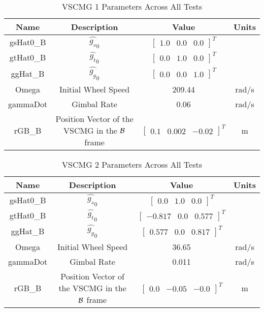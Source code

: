 \begin{table}[htbp]
	\caption{VSCMG 1 Parameters Across All Tests}
	\label{tab:rw12}
	\centering \fontsize{10}{10}\selectfont
	\begin{tabular}{ c | c | c | c } %
		\hline
		\textbf{Name}  & \textbf{Description}  & \textbf{Value} & \textbf{Units} \\
		\hline
		gsHat0\_B &  $\hat{g_s}_0$ & $\begin{bmatrix}
		1.0 & 0.0 & 0.0 \end{bmatrix}^T$ & \\
		gtHat0\_B &  $\hat{g_t}_0$ & $\begin{bmatrix}
		0.0 & 1.0 & 0.0 \end{bmatrix}^T$ & \\
		ggHat\_B &  $\hat{g_g}_0$ & $\begin{bmatrix}
		0.0 & 0.0 & 1.0 \end{bmatrix}^T$ & \\
		Omega & Initial Wheel Speed & 209.44 & rad/s \\
		gammaDot & Gimbal Rate & 0.06 & rad/s\\
		rGB\_B & Position Vector of the VSCMG in the $\cal{B}$ frame & $\begin{bmatrix}
		0.1& 0.002 & -0.02 \end{bmatrix}^T$ & m \\
		\hline
	\end{tabular}
\end{table}

\begin{table}[htbp]
	\caption{VSCMG 2 Parameters Across All Tests}
	\label{tab:rw13}
	\centering \fontsize{10}{10}\selectfont
	\begin{tabular}{ c | c | c | c } %
		\hline
		\textbf{Name}  & \textbf{Description}  & \textbf{Value} & \textbf{Units} \\
		\hline
		gsHat0\_B &  $\hat{g_s}_0$ & $\begin{bmatrix}
		0.0 & 1.0 & 0.0 \end{bmatrix}^T$ & \\
		gtHat0\_B &  $\hat{g_t}_0$ & $\begin{bmatrix}
		-0.817 & 0.0 & 0.577 \end{bmatrix}^T$ & \\
		ggHat\_B &  $\hat{g_g}_0$ & $\begin{bmatrix}
		0.577 & 0.0 & 0.817 \end{bmatrix}^T$ & \\
		Omega & Initial Wheel Speed & 36.65 & rad/s \\
		gammaDot & Gimbal Rate & 0.011 & rad/s\\
		rGB\_B & Position Vector of the VSCMG in the $\cal{B}$ frame & $\begin{bmatrix}
		0.0& -0.05 & -0.0 \end{bmatrix}^T$ & m \\
		\hline
	\end{tabular}
\end{table}

